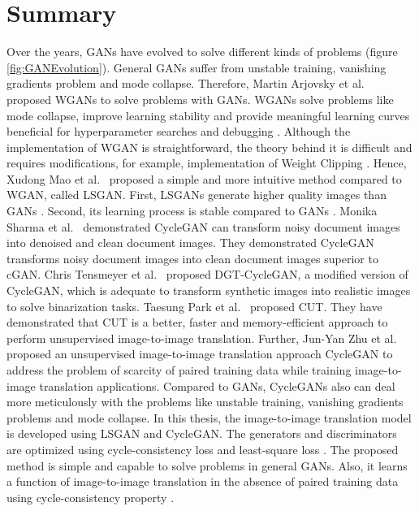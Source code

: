 \section{Summary}\label{rwsummary}
Over the years, \acp{GAN} have evolved to solve different kinds of problems (figure \ref{fig:GANEvolution}). General \acp{GAN} suffer from unstable training, vanishing gradients problem and mode collapse. Therefore, Martin Arjovsky et al.\ \cite{arjovsky2017wasserstein} proposed \acp{WGAN} to solve problems with \acp{GAN}. \acp{WGAN} solve problems like mode collapse, improve learning stability and provide meaningful learning curves beneficial for hyperparameter searches and debugging \cite{arjovsky2017wasserstein}. Although the implementation of \ac{WGAN} is straightforward, the theory behind it is difficult and requires modifications, for example, implementation of Weight Clipping \cite{gulrajani2017improved}. Hence, Xudong Mao et al.\ \cite{mao2017squares} proposed a simple and more intuitive method compared to \ac{WGAN}, called \ac{LSGAN}. First, \acp{LSGAN} generate higher quality images than \acp{GAN} \cite{mao2017squares}. Second, its learning process is stable compared to \acp{GAN} \cite{mao2017squares}. Monika Sharma et al.\ \cite{sharma2019learning} demonstrated \ac{CycleGAN} can transform noisy document images into denoised and clean document images. They demonstrated \ac{CycleGAN} transforms noisy document images into clean document images superior to \ac{cGAN}. Chris Tensmeyer et al.\ \cite{8978087} proposed DGT-CycleGAN, a modified version of \ac{CycleGAN}, which is adequate to transform synthetic images into realistic images to solve binarization tasks. Taesung Park et al.\ \cite{park2020contrastive} proposed \ac{CUT}. They have demonstrated that \ac{CUT} is a better, faster and memory-efficient approach to perform unsupervised image-to-image translation. Further, Jun-Yan Zhu et al.\ \cite{zhu2020unpaired} proposed an unsupervised image-to-image translation approach \ac{CycleGAN} to address the problem of scarcity of paired training data while training image-to-image translation applications. Compared to \acp{GAN}, \acp{CycleGAN} also can deal more meticulously with the problems like unstable training, vanishing gradients problems and mode collapse. In this thesis, the image-to-image translation model is developed using \ac{LSGAN} and \ac{CycleGAN}. The generators and discriminators are optimized using cycle-consistency loss \cite{zhu2020unpaired} and least-square loss \cite{mao2017squares}. The proposed method is simple and capable to solve problems in general \acp{GAN}. Also, it learns a function of image-to-image translation in the absence of paired training data using cycle-consistency property \cite{zhu2020unpaired}.



